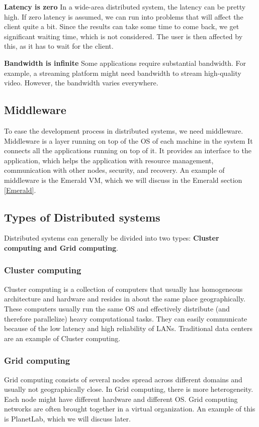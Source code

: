 \textbf{Latency is zero}
In a wide-area distributed system, the latency can be pretty high. If zero latency is assumed, we can run into problems that will affect the client quite a bit. Since the results can take some time to come back, we get significant waiting time, which is not considered. The user is then affected by this, as it has to wait for the client. 

\textbf{Bandwidth is infinite}
Some applications require substantial bandwidth. For example, a streaming platform might need bandwidth to stream high-quality video. However, the bandwidth varies everywhere.


\subsection{Middleware}
To ease the development process in distributed systems, we need middleware. Middleware is a layer running on top of the OS of each machine in the system It connects all the applications running on top of it. It provides an interface to the application, which helps the application with resource management, communication with other nodes, security, and recovery\cite{steen_distributed_2017}. An example of middleware is the Emerald VM, which we will discuss in the Emerald section \ref{Emerald}. 


\subsection{Types of Distributed systems}
Distributed systems can generally be divided into two types: \textbf{Cluster computing and Grid computing}.

\subsubsection{Cluster computing}
Cluster computing is a collection of computers that usually has homogeneous architecture and hardware and resides in about the same place geographically. These computers usually run the same OS and effectively distribute (and therefore parallelize) heavy computational tasks. They can easily communicate because of the low latency and high reliability of LANs. Traditional data centers are an example of Cluster computing. 

\subsubsection{Grid computing}
Grid computing consists of several nodes spread across different domains and usually not geographically close. In Grid computing, there is more heterogeneity. Each node might have different hardware and different OS. Grid computing networks are often brought together in a virtual organization. An example of this is PlanetLab, which we will discuss later. 




